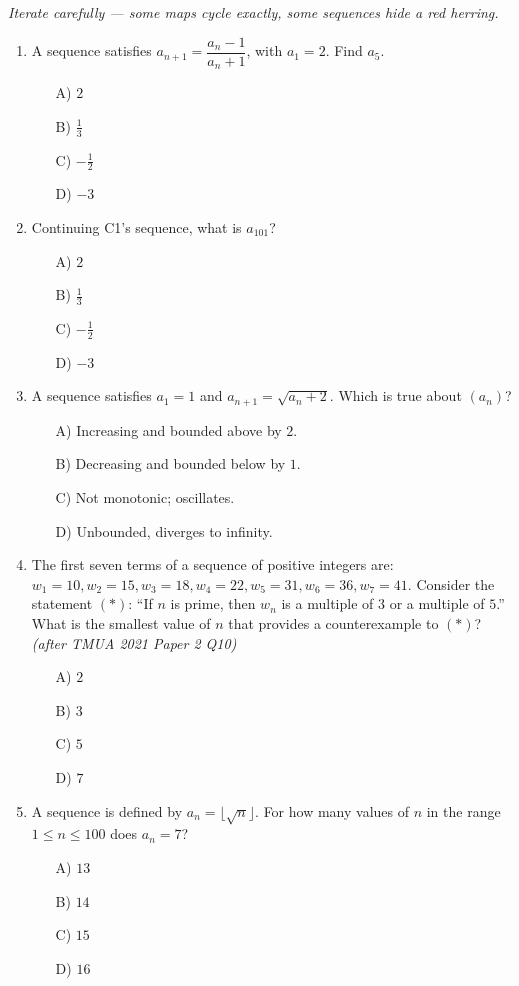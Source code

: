 \documentclass[11pt,a4paper]{article}
\begin{document}
\noindent\textit{Iterate carefully --- some maps cycle exactly, some sequences hide a red herring.}

\begin{enumerate}

\item A sequence satisfies $a_{n+1}=\dfrac{a_n-1}{a_n+1}$, with $a_1=2$. Find $a_5$.
\begin{itemize}
\item[A)] $2$
\item[B)] $\tfrac13$
\item[C)] $-\tfrac12$
\item[D)] $-3$
\end{itemize}

\item Continuing C1's sequence, what is $a_{101}$?
\begin{itemize}
\item[A)] $2$
\item[B)] $\tfrac13$
\item[C)] $-\tfrac12$
\item[D)] $-3$
\end{itemize}

\item A sequence satisfies $a_1=1$ and $a_{n+1}=\sqrt{a_n+2}$. Which is true about $(a_n)$?
\begin{itemize}
\item[A)] Increasing and bounded above by $2$.
\item[B)] Decreasing and bounded below by $1$.
\item[C)] Not monotonic; oscillates.
\item[D)] Unbounded, diverges to infinity.
\end{itemize}

\item The first seven terms of a sequence of positive integers are: $w_1=10,w_2=15,w_3=18,w_4=22,w_5=31,w_6=36,w_7=41$. Consider the statement $(*)$: ``If $n$ is prime, then $w_n$ is a multiple of $3$ or a multiple of $5$.'' What is the smallest value of $n$ that provides a counterexample to $(*)$? \textit{\small(after TMUA 2021 Paper 2 Q10)}
\begin{itemize}
\item[A)] $2$
\item[B)] $3$
\item[C)] $5$
\item[D)] $7$
\end{itemize}

\item A sequence is defined by $a_n=\lfloor\sqrt n\rfloor$. For how many values of $n$ in the range $1\leq n\leq100$ does $a_n=7$?
\begin{itemize}
\item[A)] $13$
\item[B)] $14$
\item[C)] $15$
\item[D)] $16$
\end{itemize}


\end{enumerate}
\end{document}
